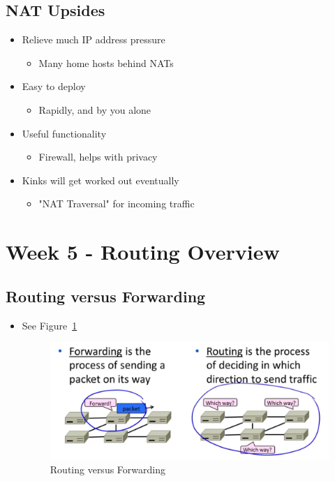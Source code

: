 \documentclass[12pt]{ctexart}   %
\begin{document}
	\subsection{NAT Upsides}
	\begin{itemize}
		\item Relieve much IP address pressure
		\begin{itemize}
			\item Many home hosts behind NATs
		\end{itemize}
		
		\item Easy to deploy
		\begin{itemize}
			\item Rapidly, and by you alone
		\end{itemize}
		
		\item Useful functionality
		\begin{itemize}
			\item Firewall, helps with privacy
		\end{itemize}
		
		\item Kinks will get worked out eventually
		\begin{itemize}
			\item "NAT Traversal" for incoming traffic
		\end{itemize}
	\end{itemize}

\section{Week 5 - Routing Overview}
	\subsection{Routing versus Forwarding}
	\begin{itemize}
		\item See Figure~\ref{fig:5-1-1}
		
		\begin{figure}[h!] %
		\centering
		 \includegraphics[scale=0.7]{images/5-1-1}
		\caption{ Routing versus Forwarding}
		 \label{fig:5-1-1}
		 \end{figure}
	\end{itemize}
	
\end{document}
